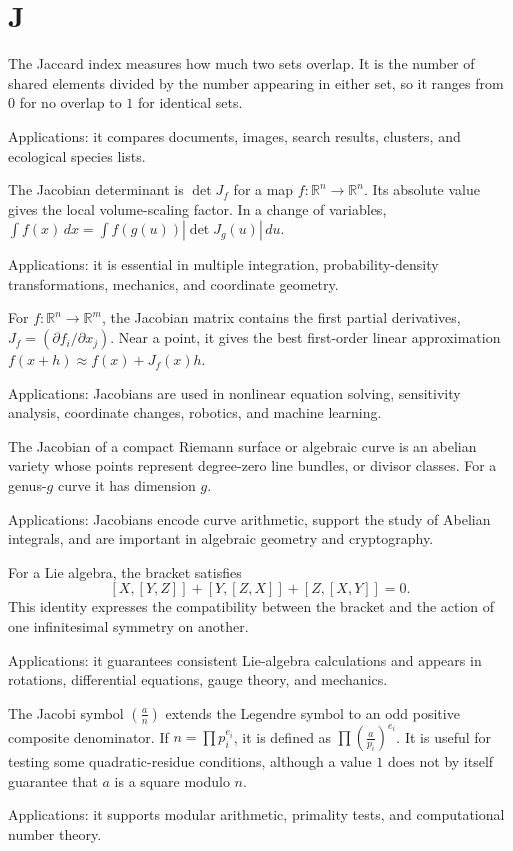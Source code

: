 \chapter*{J}
\label{chap:j}

The Jaccard index measures how much two sets overlap. It is the number of shared elements divided by the number appearing in either set, so it ranges from $0$ for no overlap to $1$ for identical sets. \par\noindent Applications: it compares documents, images, search results, clusters, and ecological species lists.

The Jacobian determinant is $\det J_f$ for a map $f:\mathbb R^n\to\mathbb R^n$. Its absolute value gives the local volume-scaling factor. In a change of variables, $\int f(x)\,dx=\int f(g(u))|\det J_g(u)|\,du$. \par\noindent Applications: it is essential in multiple integration, probability-density transformations, mechanics, and coordinate geometry.

For $f:\mathbb R^n\to\mathbb R^m$, the Jacobian matrix contains the first partial derivatives, $J_f=(\partial f_i/\partial x_j)$. Near a point, it gives the best first-order linear approximation $f(x+h)\approx f(x)+J_f(x)h$. \par\noindent Applications: Jacobians are used in nonlinear equation solving, sensitivity analysis, coordinate changes, robotics, and machine learning.

The Jacobian of a compact Riemann surface or algebraic curve is an abelian variety whose points represent degree-zero line bundles, or divisor classes. For a genus-$g$ curve it has dimension $g$. \par\noindent Applications: Jacobians encode curve arithmetic, support the study of Abelian integrals, and are important in algebraic geometry and cryptography.

For a Lie algebra, the bracket satisfies
\[
[X,[Y,Z]]+[Y,[Z,X]]+[Z,[X,Y]]=0.
\]
This identity expresses the compatibility between the bracket and the action of one infinitesimal symmetry on another. \par\noindent Applications: it guarantees consistent Lie-algebra calculations and appears in rotations, differential equations, gauge theory, and mechanics.

The Jacobi symbol $(\frac an)$ extends the Legendre symbol to an odd positive composite denominator. If $n=\prod p_i^{e_i}$, it is defined as $\prod(\frac a{p_i})^{e_i}$. It is useful for testing some quadratic-residue conditions, although a value $1$ does not by itself guarantee that $a$ is a square modulo $n$. \par\noindent Applications: it supports modular arithmetic, primality tests, and computational number theory.


